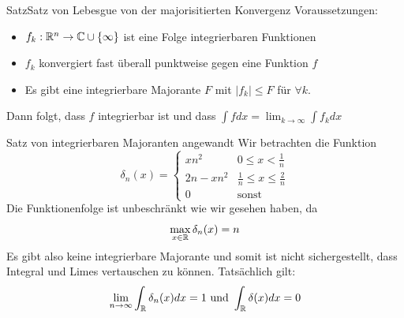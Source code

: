 \begin{Satz}{Satz}{Satz von Lebesgue von der majorisitierten Konvergenz}
    Voraussetzungen:
    \begin{itemize}
        \item $f_k:\mathbb{R}^n\rightarrow \mathbb{C} \cup \{ \infty\}$ ist eine Folge integrierbaren Funktionen
        \item $f_k$ konvergiert fast überall punktweise gegen eine Funktion $f$
        \item Es gibt eine integrierbare Majorante $F$ mit $|f_k|\leq F$ für $\forall k$.
    \end{itemize}
    Dann folgt, dass $f$ integrierbar ist und dass $\int f dx = \lim_{k\rightarrow \infty} \int f_k dx$
\end{Satz}
\begin{Beispiel}{Satz von integrierbaren Majoranten angewandt}
    Wir betrachten die Funktion
    $$\delta_n(x)=\begin{cases}
        xn^2 & 0\leq x< \frac{1}{n} \\
        2n-xn^2 & \frac{1}{n} \leq x \leq \frac{2}{n} \\
        0 & \mbox{sonst}
    \end{cases}$$
    Die Funktionenfolge ist unbeschränkt wie wir gesehen haben, da
    $$\max_{x\in\mathbb{R}} \delta_n(x)=n$$
    Es gibt also keine integrierbare Majorante und somit ist nicht sichergestellt, dass Integral und Limes vertauschen zu können. Tatsächlich gilt:
    $$\lim_{n\rightarrow \infty} \int_{\mathbb{R}} \delta_n(x) dx = 1 \mbox{ und } \int_{\mathbb{R}} \delta(x)dx = 0$$
\end{Beispiel}
